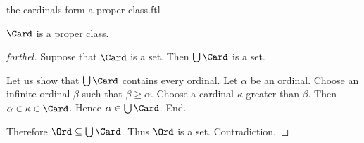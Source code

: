 \documentclass{naproche-library}
\begin{document}
\begin{smodule}[title=The Cardinals Form a Proper Class -- Cantor's First Paradox]{the-cardinals-form-a-proper-class.ftl}

\begin{theorem}[forthel,title=Cantor's First Paradox,id=cantor_paradox_1]
  $\Card$ is a proper class.
\end{theorem}
\begin{proof}[forthel]
  Suppose that $\Card$ is a set.
  Then $\bigcup \Card$ is a set.

  Let us show that $\bigcup \Card$ contains every ordinal.
    Let $\alpha$ be an ordinal.
    Choose an infinite ordinal $\beta$ such that $\beta \geq \alpha$.
    Choose a cardinal $\kappa$ greater than $\beta$.
    Then $\alpha \in \kappa \in \Card$.
    Hence $\alpha \in \bigcup \Card$.
  End.

  Therefore $\Ord \subseteq \bigcup \Card$.
  Thus $\Ord$ is a set.
  Contradiction.
\end{proof}
\end{smodule}
\end{document}
